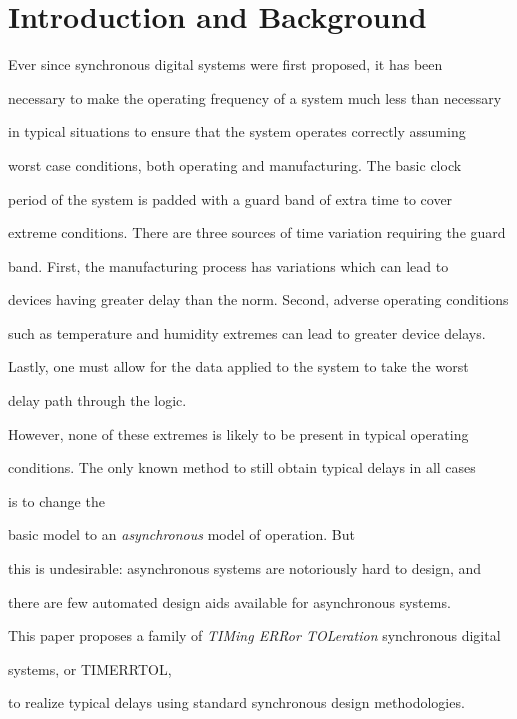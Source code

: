 \documentclass[12pt,dvips]{article}
\begin{document}
\vspace{0.15in}

 

\section{Introduction and Background}

Ever since synchronous digital systems were first proposed, it has been

necessary to make the operating frequency of a system much less than necessary

in typical situations to ensure that the system operates correctly assuming

worst case conditions, both operating and manufacturing. The basic clock

period of the system is padded with a guard band of extra time to cover

extreme conditions. There are three sources of time variation requiring the guard

band. First, the manufacturing process has variations which can lead to

devices having greater delay than the norm. Second, adverse operating conditions

such as temperature and humidity extremes can lead to greater device delays.

Lastly, one must allow for the data applied to the system to take the worst

delay path through the logic.



However, none of these extremes is likely to be present in typical operating

conditions. The only known method to still obtain typical delays in all cases

is to change the

basic model to an {\it asynchronous} model of operation\cite{Furber96}. But

this is undesirable: asynchronous systems are notoriously hard to design, and

there are few automated design aids available for asynchronous systems.



This paper proposes a family of {\it TIMing ERRor TOLeration} synchronous digital

systems, or TIMERRTOL,

to realize typical delays using standard synchronous design methodologies.
\end{document}
